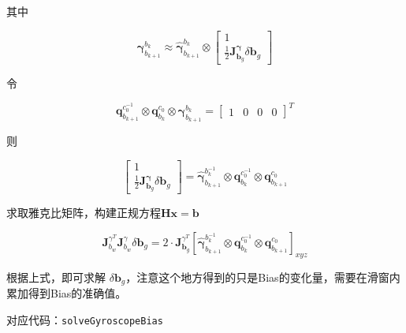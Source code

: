 \documentclass[12pt,a4paper]{article}
\begin{document}
其中

\begin{equation}
\boldsymbol{\gamma}_{b_{k+1}}^{b_{k}}
\approx 
\hat{\boldsymbol{\gamma}}_{b_{k+1}}^{b_{k}} \otimes 
\begin{bmatrix}
1 \\ \frac{1}{2} \mathbf{J}^{\boldsymbol{\gamma}}_{\mathbf{b}_{g}} \delta \mathbf{b}_{g}
\end{bmatrix}
\end{equation}

令

\begin{equation}
\mathbf{q}^{c_{0}^{-1}}_{b_{k+1}} \otimes \mathbf{q}^{c_{0}}_{b_{k}}
\otimes \boldsymbol{\gamma}_{b_{k+1}}^{b_{k}} = 
\begin{bmatrix} 1 & 0 & 0 & 0 \end{bmatrix}^T
\end{equation}

则

\begin{equation}
\begin{bmatrix}
1 \\ \frac{1}{2} \mathbf{J}^{\boldsymbol{\gamma}}_{\mathbf{b}_{g}} \delta \mathbf{b}_{g}
\end{bmatrix} = 
\hat{\boldsymbol{\gamma}}_{b_{k+1}}^{b_{k}^{-1}} \otimes 
\mathbf{q}^{c_{0}^{-1}}_{b_{k}} \otimes \mathbf{q}^{c_{0}}_{b_{k+1}}
\end{equation}

求取雅克比矩阵，构建正规方程$\mathbf{Hx} = \mathbf{b}$

\begin{equation}
\mathbf{J}^{\gamma^{T}}_{b_{w}} \mathbf{J}^{\gamma }_{b_{w}} \delta \mathbf{b}_{g}
=
2 \cdot \mathbf{J}^{\gamma^{T}}_{\mathbf{b}_g}
\left[
\hat{\boldsymbol{\gamma}}_{b_{k+1}}^{b_{k}^{-1}} \otimes \mathbf{q}^{c_{0}^{-1}}_{b_{k}} \otimes \mathbf{q}^{c_{0}}_{b_{k+1}}
\right]_{xyz}
\end{equation}

根据上式，即可求解 $\delta \mathbf{b}_g$，注意这个地方得到的只是Bias的变化量，需要在滑窗内累加得到Bias的准确值。   

对应代码：\verb|solveGyroscopeBias|
\end{document}
